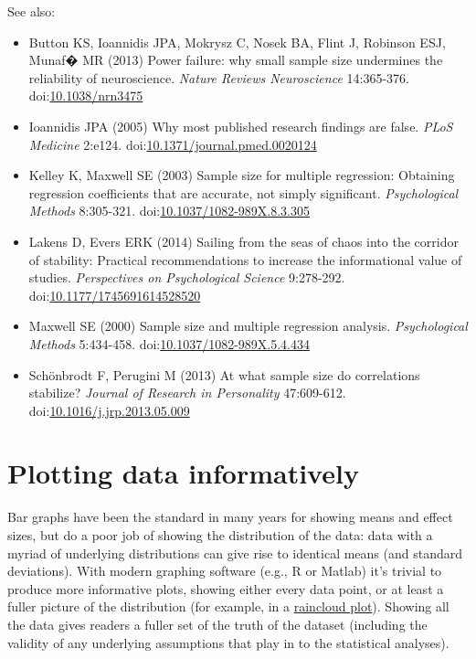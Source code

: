 \documentclass[letterpaper,oneside,11pt,article, portrait]{memoir}
\newcommand{\doi}[1]{doi:\href{http://dx.doi.org/#1}{#1}}
\newcommand{\journal}[1]{\textit{#1}} 			%
\begin{document}
\vspace{1em} \noindent See also:

\begin{itemize}
\item Button KS, Ioannidis JPA, Mokrysz C, Nosek BA, Flint J, Robinson ESJ, Munaf� MR (2013) Power failure: why small sample size undermines the reliability of neuroscience. \journal{Nature Reviews Neuroscience} 14:365-376. \doi{10.1038/nrn3475}

\item Ioannidis JPA (2005) Why most published research findings are false. \journal{PLoS Medicine} 2:e124. \doi{10.1371/journal.pmed.0020124}

\item Kelley K, Maxwell SE (2003) Sample size for multiple regression: Obtaining regression coefficients that are accurate, not simply significant. \journal{Psychological Methods} 8:305-321. \doi{10.1037/1082-989X.8.3.305}

\item Lakens D, Evers ERK (2014) Sailing from the seas of chaos into the corridor of stability: Practical recommendations to increase the informational value of studies. \journal{Perspectives on Psychological Science} 9:278-292. \doi{10.1177/1745691614528520}

\item Maxwell SE (2000) Sample size and multiple regression analysis. \journal{Psychological Methods} 5:434-458. \doi{10.1037/1082-989X.5.4.434}

\item Sch\"{o}nbrodt F, Perugini M (2013) At what sample size do correlations stabilize? \journal{Journal of Research in Personality} 47:609-612. \doi{10.1016/j.jrp.2013.05.009}

\end{itemize}


\chapter{Plotting data informatively} \label{plotting}

Bar graphs have been the standard in many years for showing means and effect sizes, but do a poor job of showing the distribution of the data: data with a myriad of underlying distributions can give rise to identical means (and standard deviations). With modern graphing software (e.g., R or Matlab) it's trivial to produce more informative plots, showing either every data point, or at least a fuller picture of the distribution (for example, in a \href{https://peerj.com/preprints/27137v1/}{raincloud plot}). Showing all the data gives readers a fuller set of the truth of the dataset (including the validity of any underlying assumptions that play in to the statistical analyses).
\end{document}

